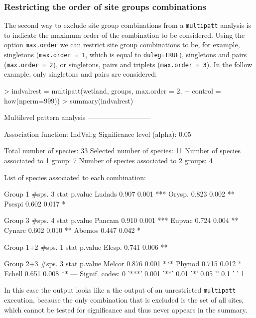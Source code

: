 \documentclass[11pt,a4paper]{article}
\begin{document}
\subsubsection{Restricting the order of site groups combinations}
The second way to exclude site group combinations from a \texttt{multipatt} analysis is to indicate the maximum order of the combination to be considered. Using the option \texttt{max.order} we can restrict site group combinations to be, for example, singletons (\texttt{max.order = 1}, which is equal to \texttt{duleg=TRUE}), singletons and pairs (\texttt{max.order = 2}), or singletons, pairs and triplets (\texttt{max.order = 3}). In the follow example, only singletons and pairs are considered: 
\begin{Schunk}
\begin{Sinput}
> indvalrest = multipatt(wetland, groups, max.order = 2, 
+                        control = how(nperm=999)) 
> summary(indvalrest)
\end{Sinput}
\begin{Soutput}
 Multilevel pattern analysis
 ---------------------------

 Association function: IndVal.g
 Significance level (alpha): 0.05

 Total number of species: 33
 Selected number of species: 11 
 Number of species associated to 1 group: 7 
 Number of species associated to 2 groups: 4 

 List of species associated to each combination: 

 Group 1  #sps.  3 
        stat p.value    
Ludads 0.907   0.001 ***
Orysp. 0.823   0.002 ** 
Psespi 0.602   0.017 *  

 Group 3  #sps.  4 
        stat p.value    
Pancam 0.910   0.001 ***
Eupvac 0.724   0.004 ** 
Cynarc 0.602   0.010 ** 
Abemos 0.447   0.042 *  

 Group 1+2  #sps.  1 
        stat p.value   
Elesp. 0.741   0.006 **

 Group 2+3  #sps.  3 
        stat p.value    
Melcor 0.876   0.001 ***
Phynod 0.715   0.012 *  
Echell 0.651   0.008 ** 
---
Signif. codes:  0 '***' 0.001 '**' 0.01 '*' 0.05 '.' 0.1 ' ' 1 
\end{Soutput}
\end{Schunk}
In this case the output looks like a the output of an unrestricted \texttt{multipatt} execution, because the only combination that is excluded is the set of all sites, which cannot be tested for significance and thus never appears in the summary. 
\end{document}
